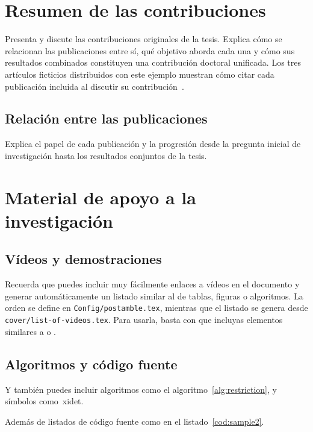 {
  \section{Resumen de las contribuciones}

  Presenta y discute las contribuciones originales de la tesis. Explica cómo se relacionan las publicaciones entre sí, qué objetivo aborda cada una y cómo sus resultados combinados constituyen una contribución doctoral unificada. Los tres artículos ficticios distribuidos con este ejemplo muestran cómo citar cada publicación incluida al discutir su contribución~\cite{garcia2026paper1,garcia2026paper2,garcia2026paper3}.

  \subsection{Relación entre las publicaciones}

  Explica el papel de cada publicación y la progresión desde la pregunta inicial de investigación hasta los resultados conjuntos de la tesis.

  \section{Material de apoyo a la investigación}
  \subsection{Vídeos y demostraciones}

  Recuerda que puedes incluir muy fácilmente enlaces a vídeos en el documento y generar automáticamente un listado similar al de tablas, figuras o algoritmos. La orden se define en \texttt{Config/postamble.tex}, mientras que el listado se genera desde \texttt{cover/list-of-videos.tex}. Para usarla, basta con que incluyas elementos similares a  o .

  \subsection{Algoritmos y código fuente}

  Y también puedes incluir algoritmos como el algoritmo~\ref{alg:restriction}, y símbolos como~\ac{xidet}.

  Además de listados de código fuente como en el listado~\ref{cod:sample2}.

}


